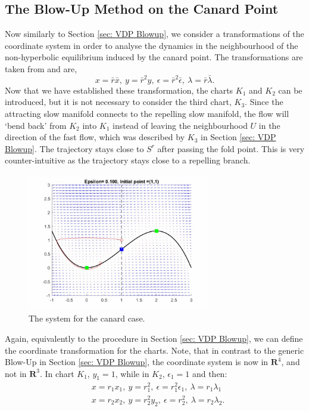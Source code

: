 \subsection{The Blow-Up Method on the Canard Point}
Now similarly to Section \ref{sec: VDP Blowup}, we consider a transformations of the coordinate system in order to analyse the dynamics in the neighbourhood of the non-hyperbolic equilibrium induced by the canard point. %
 The transformations are taken from \citep{krupa2001} and are,
\begin{equation}
x=\bar{r}\bar{x}, \ y=\bar{r}^2y, \ \epsilon=\bar{r}^2\bar{\epsilon}, \ \lambda=\bar{r}\bar{\lambda}.
\end{equation}
Now that we have established these transformation, the charts $K_1$ and $K_2$ can be introduced,  but it is not necessary to consider the third chart, $K_3$. Since the attracting slow manifold connects to the repelling slow manifold, the flow will `bend back' from $K_2$ into $K_1$ instead of leaving the neighbourhood $U$ in the direction of the fast flow, which was described by $K_3$ in Section \ref{sec: VDP Blowup}. 
The trajectory stays close to $S^r$ after passing the fold point. This is very counter-intuitive as the trajectory stays close to a repelling branch.
\begin{figure}[h!]
	\centering
\includegraphics[width=8cm, height=6cm]{Images/vdPhopf-Moment-bendback}
	\caption{The \vdp system for the canard case.}
	\label{fig: flow in canard}
\end{figure}\newpage
Again, equivalently to the procedure in Section \ref{sec: VDP Blowup}, we can define the coordinate transformation for the charts. Note, that in contrast to the generic Blow-Up in Section \ref{sec: VDP Blowup}, the coordinate system is now in $\mathbf{R}^4$, and not in $\mathbf{R}^3$. In chart $K_1$, $y_1=1$, while in $K_2$, $\epsilon_1=1$ and then:
\begin{subequations}
	\begin{align}
	&x=r_1x_1, \ y=r_1^2, \ \epsilon=r_1^2\epsilon_1, \ \lambda=r_1\lambda_1 \label{eq: coordiante K1}\\ 
	&x=r_2x_2, \ y=r_2^2y_2, \ \epsilon=r^2_2, \ \lambda=r_2\lambda_2 \label{eq: coordinate K2}.
	\end{align}
\end{subequations}
